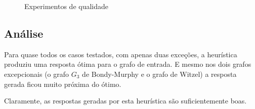 \begin{figure}[htb!]
\centering
{}
\caption{Experimentos de qualidade}
\label{fig:eq4}
\end{figure}


\subsection{Análise}
Para quase todos os casos testados, com apenas duas exceções, a
heurística produziu uma resposta ótima para o grafo de entrada. E
mesmo nos dois grafos excepcionais (o grafo $G_3$ de Bondy-Murphy e o
grafo de Witzel) a resposta gerada ficou muito próxima do ótimo.

Claramente, as respostas geradas por esta heurística são
suficientemente boas.
